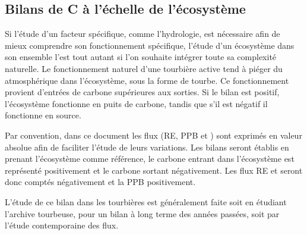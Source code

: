 \subsection{Bilans de C à l'échelle de l'écosystème}

Si l'étude d'un facteur spécifique, comme l'hydrologie, est nécessaire afin de mieux comprendre son fonctionnement spécifique, l'étude d'un écosystème dans son ensemble l'est tout autant si l'on souhaite intégrer toute sa complexité naturelle.
Le fonctionnement naturel d'une tourbière active tend à piéger du \coo atmosphérique dans l'écosystème, sous la forme de tourbe.
Ce fonctionnement provient d'entrées de carbone supérieures aux sorties.
Si le bilan est positif, l'écosystème fonctionne en puits de carbone, tandis que s'il est négatif il fonctionne en source.

Par convention, dans ce document les flux (RE, PPB et \fchh) sont exprimés en valeur absolue afin de faciliter l'étude de leurs variations.
Les bilans seront établis en prenant l'écosystème comme référence, le carbone entrant dans l'écosystème est représenté positivement et le carbone sortant négativement.
Les flux RE et \fchh seront donc comptés négativement et la PPB positivement.

L'étude de ce bilan dans les tourbières est généralement faite soit en étudiant l'archive tourbeuse, pour un bilan à long terme des années passées, soit par l'étude contemporaine des flux.


